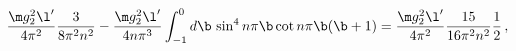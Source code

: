 \begin{equation}
\frac{\m g_2^2\l'}{4\pi^2}\frac{3}{8\pi^2 n^2}
-\frac{\m g_2^2\l'}{4n\pi^3}\int_{-1}^0 d\b\,\sin^4n\pi\b\cot n\pi\b(\b+1)
=\frac{\m g_2^2\l'}{4\pi^2}\frac{15}{16\pi^2 n^2}\frac{1}{2}\,,
\end{equation}

